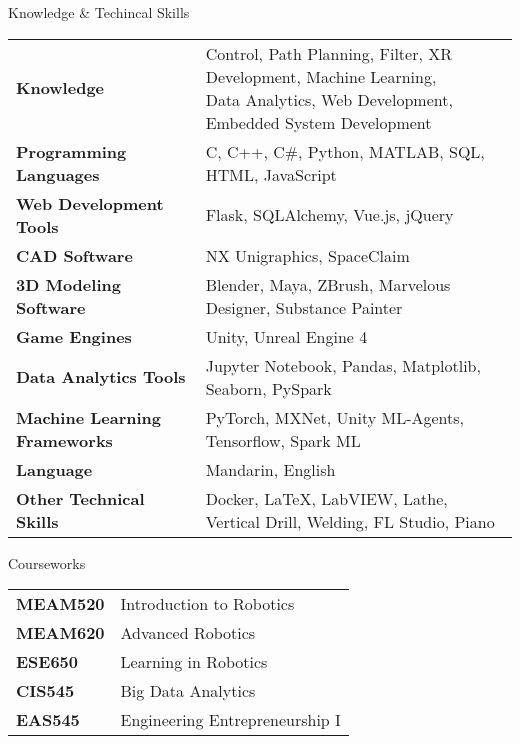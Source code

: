 \documentclass{resume} %
\begin{document}
\begin{rSection}{Knowledge \& Techincal Skills}

\begin{tabular}{ @{} >{\bfseries}l @{\hspace{6ex}} l }
Knowledge & \pbox{20cm}{Control, Path Planning, Filter, XR Development, Machine Learning, 
                        \\Data Analytics, Web Development, Embedded System Development
                        } \smallskip\\

Programming Languages & C, C++, C\#, Python, MATLAB, SQL, HTML, JavaScript\\
Web Development Tools & Flask, SQLAlchemy, Vue.js, jQuery \\
CAD Software & NX Unigraphics, SpaceClaim  \\
3D Modeling Software & Blender, Maya, ZBrush, Marvelous Designer, Substance Painter\\
Game Engines & Unity, Unreal Engine 4 \\
Data Analytics Tools & Jupyter Notebook, Pandas, Matplotlib, Seaborn, PySpark\\
Machine Learning Frameworks & PyTorch, MXNet, Unity ML-Agents, Tensorflow, Spark ML\\
Language & Mandarin, English \\
Other Technical Skills & Docker, LaTeX, LabVIEW, Lathe, Vertical Drill, Welding, FL Studio, Piano
\end{tabular}

\end{rSection}


\begin{rSection}{Courseworks}

	
\begin{tabular} { @{} >{\bfseries}l @{\hspace{6ex}} l }
MEAM520 & Introduction to Robotics \\
MEAM620 & Advanced Robotics \\
ESE650 & Learning in Robotics \\
CIS545 & Big Data Analytics\\
EAS545 & Engineering Entrepreneurship I

\end{tabular}

\end{rSection}






\end{document}
